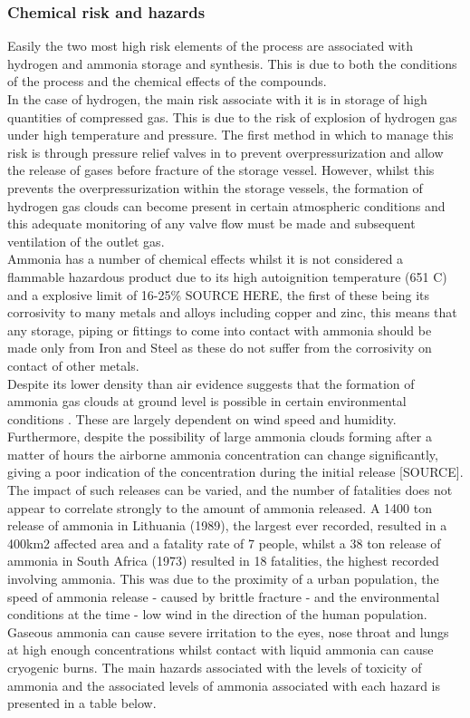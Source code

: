 {\subsubsection{Chemical risk and hazards}
Easily the two most high risk elements of the process are associated with hydrogen and ammonia storage and synthesis. This is due to both the conditions of the process and the chemical effects of the compounds. 
\\
In the case of hydrogen, the main risk associate with it is in storage of high quantities of compressed gas. This is due to the risk of explosion of hydrogen gas under high temperature and pressure. The first method in which to manage this risk is through pressure relief valves in to prevent overpressurization and allow the release of gases before fracture of the storage vessel. However, whilst this prevents the overpressurization within the storage vessels, the formation of hydrogen gas clouds can become present in certain atmospheric conditions and this adequate monitoring of any valve flow must be made and subsequent ventilation of the outlet gas. 
\\
Ammonia has a number of chemical effects whilst it is not considered a  flammable hazardous product due to its high autoignition temperature (651 \textdegree C) and a explosive limit of 16-25\% SOURCE HERE, the first of these being its corrosivity to many metals and alloys including copper and zinc, this means that any storage, piping or fittings to come into contact with ammonia should be made only from Iron and Steel as these do not suffer from the corrosivity on contact of other metals.
\\
Despite its lower density than air evidence suggests that the formation of ammonia gas clouds at ground level is possible in certain environmental conditions \cite{Griffiths1982}. These are largely dependent on wind speed and humidity. Furthermore, despite the possibility of large ammonia clouds forming after a matter of hours the airborne ammonia concentration can change significantly, giving a poor indication of the concentration during the initial release [SOURCE].
\\
The impact of such releases can be varied, and the number of fatalities does not appear to correlate strongly to the amount of ammonia released. A 1400 ton release of ammonia in Lithuania (1989), the largest ever recorded, resulted in a 400km2 affected area and a fatality rate of 7 people, whilst a 38 ton release of ammonia in South Africa (1973) resulted in 18 fatalities,  the highest recorded involving ammonia. This was due to the proximity of a urban population, the speed of ammonia release - caused by brittle fracture - and the environmental conditions at the time - low wind in the direction of the human population. 
\\
Gaseous ammonia can cause severe irritation to the eyes, nose throat and lungs at high enough concentrations whilst contact with liquid ammonia can cause cryogenic burns. The main hazards associated with the levels of toxicity of ammonia and the associated levels of ammonia associated with each hazard is presented in a table below.
\\

}

